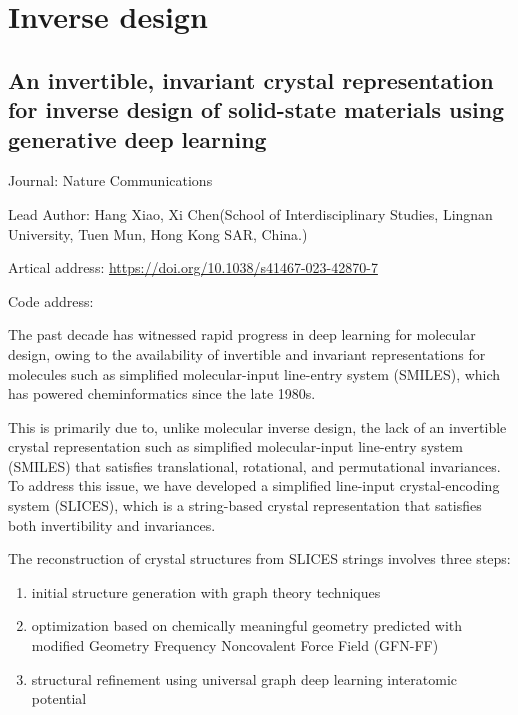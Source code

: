 \documentclass[11pt]{elegantbook}
\begin{document}
\section{Inverse design}
\subsection{An invertible, invariant crystal representation for inverse design of solid-state materials using generative deep learning}
\begin{brief}
    \item Journal: Nature Communications
    \item Lead Author: Hang Xiao, Xi Chen(School of Interdisciplinary Studies, Lingnan University, Tuen Mun, Hong Kong SAR, China.)
    \item Artical address: \href{https://doi.org/10.1038/s41467-023-42870-7}{https://doi.org/10.1038/s41467-023-42870-7}
    \item Code address: 
\end{brief}
The past decade has witnessed rapid progress in deep learning for molecular
design, owing to the availability of invertible and invariant representations for
molecules such as simplified molecular-input line-entry system (SMILES),
which has powered cheminformatics since the late 1980s.

This is primarily due to, unlike molecular inverse design, the lack of an invertible crystal representation such as simplified molecular-input line-entry system (SMILES) that satisfies translational, rotational, and permutational invariances. To address this issue, we have developed a simplified line-input crystal-encoding system (SLICES), which is a string-based crystal representation that satisfies both invertibility and invariances.

The reconstruction of crystal structures from SLICES strings involves three steps: 
\begin{enumerate}
    \item initial structure generation with graph theory techniques
    \item optimization based on chemically meaningful geometry predicted with modified Geometry Frequency Noncovalent Force Field (GFN-FF)
    \item structural refinement using universal graph deep learning interatomic potential
\end{enumerate}
\end{document}
